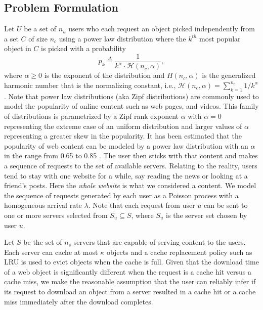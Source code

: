 \documentclass[conference]{IEEEtran}
\begin{document}
\subsection{Problem Formulation}
Let  $U$ be a set of $n_u$ users who each request an object picked independently from a set $C$ of size $n_c$ using a power law distribution where the $k^{th}$ most popular object in $C$ is picked with a probability \begin{equation}
p_k \stackrel{\Delta}{=} \frac{1}{k^\alpha \cdot \mathcal{H}(n_c, \alpha)}, \label{eq:powerlaw}
\end{equation} where $\alpha \geq 0 $ is the exponent of the distribution and $H(n_c, \alpha)$ is the generalized harmonic number that is the normalizing constant, i.e.,  $\mathcal{H}(n_c, \alpha) = \sum_{k=1}^{n_c} 1/k^{\alpha} $. Note that power law distributions (aka Zipf distributions) are commonly used to model the popularity of  online content such as web pages, and videos. This family of distributions is parametrized by a Zipf rank exponent  $\alpha$ with $\alpha = 0$ representing the extreme case of an uniform distribution and larger values of $\alpha$ representing a greater skew in the popularity. It has been estimated that the popularity of web content can be modeled by a power law distribution with an $\alpha$  in the range from 0.65 to 0.85 \cite{Breslau:1999,Gill:2007,Fricker:2012}.
The user then sticks with that content and makes a sequence of requests to the set of available servers. Relating to the reality, users tend to stay with one website for a while, say reading the news or looking at a friend's posts. Here the \textsl{whole website} is what we considered a content. We model  the sequence of requests generated by each user as a Poisson process with a homogeneous arrival rate $\lambda$.  Note that each request from user $u$ can be sent to one or more servers selected from $S_u \subseteq S$, where $S_u$ is the server set chosen by user $u$.

Let  $S$ be the set of $n_s$ servers that are capable of serving content to the users. Each server can cache at most $\kappa$ objects and a cache replacement policy such as LRU is used to evict objects when the cache is full. Given that the download time of a web object is significantly different when the request is a cache hit versus a cache miss, we make the reasonable assumption that the user can reliably infer if its request to download an object from a server resulted in a  cache hit or a cache miss immediately after the download completes.
\end{document}
